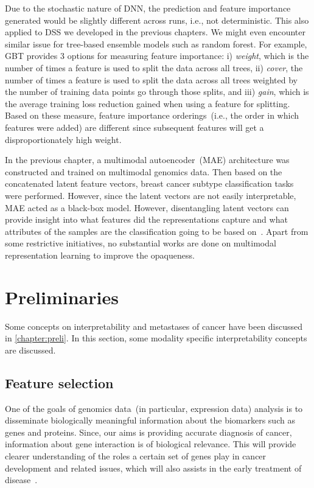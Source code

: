 \hspace*{3.5mm} Due to the stochastic nature of DNN, the prediction and feature importance generated would be slightly different across runs, i.e., not deterministic. This also applied to DSS we developed in the previous chapters. We might even encounter similar issue for tree-based ensemble models such as random forest. For example, GBT provides 3 options for measuring feature importance: i) \emph{weight}, which is the number of times a feature is used to split the data across all trees, ii) \emph{cover}, the number of times a feature is used to split the data across all trees weighted by the number of training data points go through those splits, and iii) \emph{gain}, which is the average training loss reduction gained when using a feature for splitting. Based on these measure, feature importance orderings~(i.e., the order in which features were added) are different since subsequent features will get a disproportionately high weight.

\hspace*{3.5mm} In the previous chapter, a multimodal autoencoder~(MAE) architecture was constructed and trained on multimodal genomics data. Then based on the concatenated latent feature vectors, breast cancer subtype classification tasks were performed. However, since the latent vectors are not easily interpretable, MAE acted as a black-box model. However, disentangling latent vectors can provide insight into what features did the representations capture and what attributes of the samples are the classification going to be based on~\cite{karimTCBB2020}. 
Apart from some restrictive initiatives, no substantial works are done on multimodal representation learning to improve the opaqueness.

\section{Preliminaries}
Some concepts on interpretability and metastases of cancer have been discussed in \cref{chapter:preli}. In this section, some modality specific interpretability concepts are discussed.  

\subsection{Feature selection}
One of the goals of genomics data~(in particular, expression data) analysis is to disseminate biologically meaningful information about the biomarkers such as genes and proteins. 
Since, our aims is providing accurate diagnosis of cancer, information about gene interaction is of biological relevance. This will provide clearer understanding of the roles a certain set of genes play in cancer development and related issues, which will also assists in the  early treatment of disease~\cite{lu2003cancer}. %

